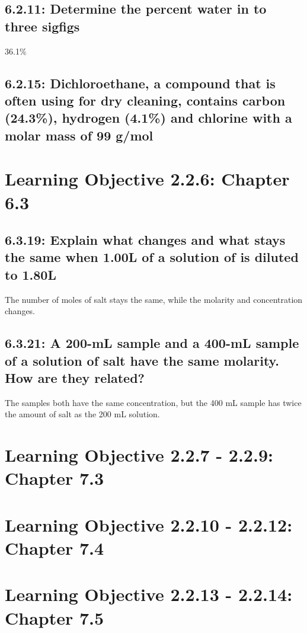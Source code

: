 \documentclass[11pt, letterpaper]{article}
\begin{document}
\subsection*{6.2.11: Determine the percent water in  to three sigfigs}
36.1\%
\subsection*{6.2.15: Dichloroethane, a compound that is often using for dry cleaning,
contains carbon (24.3\%), hydrogen (4.1\%) and chlorine with a molar mass of 99 g/mol}

\section*{Learning Objective 2.2.6: Chapter 6.3}
\subsection*{6.3.19: Explain what changes and what stays the same when 1.00L of a 
solution of  is diluted to 1.80L}
The number of moles of salt stays the same, while the molarity and concentration changes.

\subsection*{6.3.21: A 200-mL sample and a 400-mL sample of a solution of salt 
have the same molarity. How are they related?}

The samples both have the same concentration, but the 400 mL sample has twice the
amount of salt as the 200 mL solution.


\section*{Learning Objective 2.2.7 - 2.2.9: Chapter 7.3}




\section*{Learning Objective 2.2.10 - 2.2.12: Chapter 7.4}




\section*{Learning Objective 2.2.13 - 2.2.14: Chapter 7.5}
\end{document}
